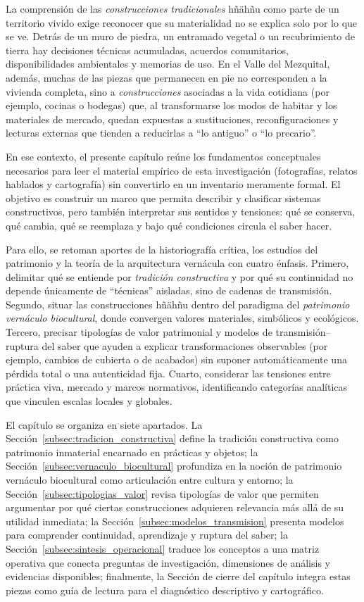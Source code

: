 La comprensión de las \emph{construcciones tradicionales} hñähñu como parte de un territorio vivido exige reconocer que su materialidad no se explica solo por lo que se ve. Detrás de un muro de piedra, un entramado vegetal o un recubrimiento de tierra hay decisiones técnicas acumuladas, acuerdos comunitarios, disponibilidades ambientales y memorias de uso. En el Valle del Mezquital, además, muchas de las piezas que permanecen en pie no corresponden a la vivienda completa, sino a \emph{construcciones} asociadas a la vida cotidiana (por ejemplo, cocinas o bodegas) que, al transformarse los modos de habitar y los materiales de mercado, quedan expuestas a sustituciones, reconfiguraciones y lecturas externas que tienden a reducirlas a ``lo antiguo'' o ``lo precario''.

En ese contexto, el presente capítulo reúne los fundamentos conceptuales necesarios para leer el material empírico de esta investigación (fotografías, relatos hablados y cartografía) sin convertirlo en un inventario meramente formal. El objetivo es construir un marco que permita describir y clasificar sistemas constructivos, pero también interpretar sus sentidos y tensiones: qué se conserva, qué cambia, qué se reemplaza y bajo qué condiciones circula el saber hacer.

Para ello, se retoman aportes de la historiografía crítica, los estudios del patrimonio y la teoría de la arquitectura vernácula con cuatro énfasis. Primero, delimitar qué se entiende por \emph{tradición constructiva} y por qué su continuidad no depende únicamente de ``técnicas'' aisladas, sino de cadenas de transmisión. Segundo, situar las construcciones hñähñu dentro del paradigma del \emph{patrimonio vernáculo biocultural}, donde convergen valores materiales, simbólicos y ecológicos. Tercero, precisar tipologías de valor patrimonial y modelos de transmisión--ruptura del saber que ayuden a explicar transformaciones observables (por ejemplo, cambios de cubierta o de acabados) sin suponer automáticamente una pérdida total o una autenticidad fija. Cuarto, considerar las tensiones entre práctica viva, mercado y marcos normativos, identificando categorías analíticas que vinculen escalas locales y globales.

El capítulo se organiza en siete apartados. La Sección~\ref{subsec:tradicion_constructiva} define la tradición constructiva como patrimonio inmaterial encarnado en prácticas y objetos; la Sección~\ref{subsec:vernaculo_biocultural} profundiza en la noción de patrimonio vernáculo biocultural como articulación entre cultura y entorno; la Sección~\ref{subsec:tipologias_valor} revisa tipologías de valor que permiten argumentar por qué ciertas construcciones adquieren relevancia más allá de su utilidad inmediata; la Sección~\ref{subsec:modelos_transmision} presenta modelos para comprender continuidad, aprendizaje y ruptura del saber; la Sección~\ref{subsec:sintesis_operacional} traduce los conceptos a una matriz operativa que conecta preguntas de investigación, dimensiones de análisis y evidencias disponibles; finalmente, la Sección de cierre del capítulo integra estas piezas como guía de lectura para el diagnóstico descriptivo y cartográfico.
